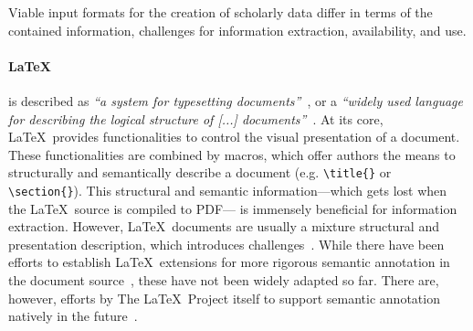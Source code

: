 Viable input formats for the creation of scholarly data differ in terms of the contained information, challenges for information extraction, availability, and use.


\paragraph{\LaTeX}
is described as \textit{``a system for typesetting documents''}~\cite{Lamport1994}, or a \textit{``widely used language for describing the logical structure of [...] documents''}~\cite{Mittelbach2023}. At its core, \LaTeX\ provides functionalities to control the visual presentation of a document. These functionalities are combined by macros, which offer authors the means to structurally and semantically describe a document (e.g. \texttt{\textbackslash title\{\}} or \texttt{\textbackslash section\{\}}). This structural and semantic information---which gets lost when the \LaTeX\ source is compiled to PDF---
is immensely beneficial for information extraction.
However, \LaTeX\ documents are usually a mixture structural and presentation description, which introduces challenges~\cite{Stamerjohanns2008}.
While there have been efforts to establish \LaTeX\ extensions for more rigorous semantic annotation in the document source~\cite{Krieg2004,Groza2007,Bless2023}, these have not been widely adapted so far.
There are, however, efforts by The \LaTeX\ Project itself to support semantic annotation natively in the future~\cite{Mittelbach2020,Mittelbach2023}.

